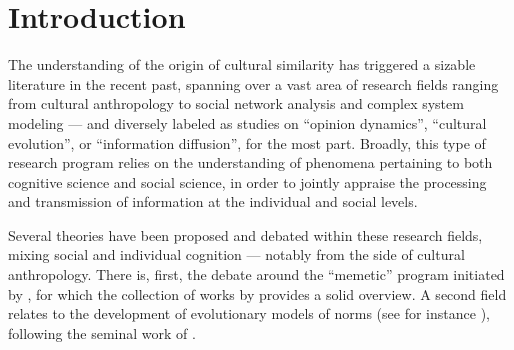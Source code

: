 \section{Introduction} %



The understanding of the origin of cultural similarity has triggered a sizable literature in the recent past, spanning over a vast area of research fields ranging from cultural anthropology to social network analysis and complex system modeling --- and diversely labeled as studies on ``opinion dynamics'', ``cultural evolution'', or ``information diffusion'', for the most part.  Broadly, this type of research program relies on the understanding of phenomena pertaining to both cognitive science and social science, in order to jointly appraise the processing and transmission of information at the individual and social levels. %

Several theories have been proposed and debated within these research fields, mixing social and individual cognition --- notably from the side of cultural anthropology.  There is, first, the debate around the ``memetic'' program initiated by \citet{Dawkins76}, for which the collection of works by \citet{Aunger00} provides a solid overview. A second field relates to the development of evolutionary models of norms (see for instance \citealp{Ehrlich05}), following the seminal work of  \citet{Boyd85}. 


